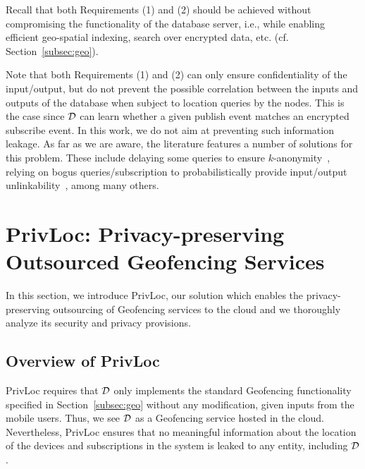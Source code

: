 \documentclass{llncs}
\newcommand\sol{{\sf PrivLoc}}
\begin{document}
Recall that both Requirements (1) and (2) should be achieved without compromising the functionality of the database server, i.e., while enabling efficient geo-spatial indexing, search over encrypted data, etc. (cf. Section~\ref{subsec:geo}).


\vspace{1 em}  Note that both Requirements (1) and (2) can only ensure confidentiality of the input/output, but do not prevent the possible correlation between
the inputs and outputs of the database when subject to location queries by the nodes. This is the case since $\cal D$ can learn whether a given publish event matches an encrypted subscribe event.
In this work, we do not aim at preventing such information leakage. As far as we are aware, the literature features a number of solutions for this problem. These include delaying some queries to ensure $k$-anonymity~\cite{Guha:2012:KLP:2228298.2228317,Sweeney:2002:AKA:774544.774553,Sweeney:2002:KAM:774544.774552}, relying on
bogus queries/subscription to probabilistically provide input/output unlinkability~\cite{Kido05ananonymous}, among many others.


\section{PrivLoc: Privacy-preserving Outsourced Geofencing Services}\label{sec:solution}

In this section, we introduce \sol, our solution which enables the privacy-preserving outsourcing of Geofencing services to the cloud and we thoroughly analyze its security and privacy provisions.


\subsection{Overview of PrivLoc}\label{subsec:overview}

\sol{} requires that $\cal D$ only implements the standard Geofencing functionality specified in Section~\ref{subsec:geo} without any modification, given inputs from the mobile users. Thus, we see $\cal D$ as a Geofencing service hosted in the cloud. Nevertheless, \sol{} ensures that no meaningful information about the location of the devices and subscriptions in the system is leaked to any entity, including $\cal D$.
\end{document}
